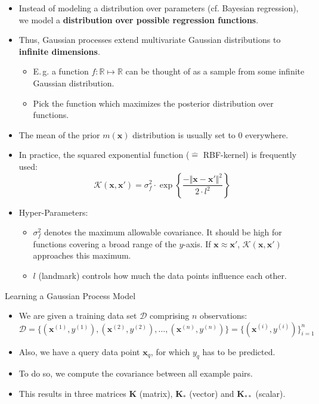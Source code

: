 \begin{frame}
	\begin{itemize}
		\item Instead of modeling a distribution over parameters (cf. Bayesian regression), we model a \textbf{distribution over possible regression functions}.
		\item Thus, Gaussian processes extend multivariate Gaussian distributions to \textbf{infinite dimensions}.
		\begin{itemize}
			\item E.\,g. a function $f : \mathbb{R} \mapsto \mathbb{R}$ can be thought of as a sample from some infinite Gaussian distribution.
			\item Pick the function which maximizes the posterior distribution over functions.
		\end{itemize}
		\item The mean of the prior $m(\bm{x})$ distribution is usually set to 0 everywhere.
		\item In practice, the squared exponential function ($\widehat{=}$ RBF-kernel) is frequently used:
		\begin{equation}
			\mathcal{K}(\bm{x}, \bm{x}') = \sigma_f^2 \cdot \exp\left\{ \frac{-\Vert \bm{x} - \bm{x}' \Vert^2}{2 \cdot l^2} \right\}
		\end{equation}
		\item Hyper-Parameters:
		\begin{itemize}
			\item $\sigma_f^2$ denotes the maximum allowable covariance. It should be high for functions covering a broad range of the $y$-axis. If $\bm{x} \approx \bm{x}'$,
				$\mathcal{K}(\bm{x}, \bm{x}')$ approaches this maximum.
			\item $l$ (landmark) controls how much the data points influence each other.
		\end{itemize}
	\end{itemize}
\end{frame}


\begin{dwHeaderFrame}{Learning a Gaussian Process Model}
	\begin{itemize}
		\item We are given a training data set $\mathcal{D}$ comprising $n$ observations:
		\begin{equation*}
			\mathcal{D} = \{ (\bm{x}^{(1)}, y^{(1)}), (\bm{x}^{(2)}, y^{(2)}), \dots, (\bm{x}^{(n)}, y^{(n)}) \} = \{ (\bm{x}^{(i)}, y^{(i)}) \}_{i=1}^n
		\end{equation*}
		\item Also, we have a query data point $\bm{x}_q$, for which $y_q$ has to be predicted.
		\item To do so, we compute the covariance between all example pairs.
		\item This results in three matrices $\bm{K}$ (matrix), $\bm{K}_*$ (vector) and $\bm{K}_{**}$ (scalar).
	\end{itemize}
\end{dwHeaderFrame}


